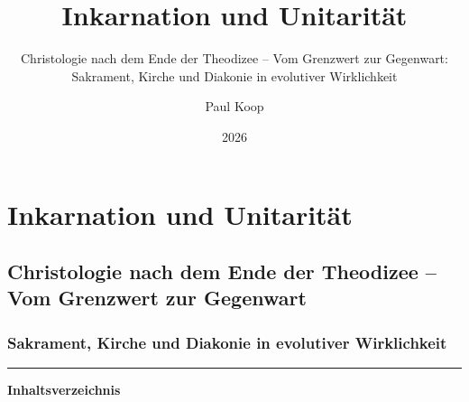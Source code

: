 \documentclass[
  ngerman,
]{article}
\title{Inkarnation und Unitarität}
\subtitle{Christologie nach dem Ende der Theodizee -- Vom Grenzwert zur
Gegenwart: Sakrament, Kirche und Diakonie in evolutiver Wirklichkeit}
\author{Paul Koop}
\date{2026}
\begin{document}
\maketitle

{
\setcounter{tocdepth}{3}
\tableofcontents
}
\section{Inkarnation und
Unitarität}\label{inkarnation-und-unitarituxe4t}

\subsection{Christologie nach dem Ende der Theodizee -- Vom Grenzwert
zur
Gegenwart}\label{christologie-nach-dem-ende-der-theodizee-vom-grenzwert-zur-gegenwart}

\subsubsection{Sakrament, Kirche und Diakonie in evolutiver
Wirklichkeit}\label{sakrament-kirche-und-diakonie-in-evolutiver-wirklichkeit}

\begin{center}\rule{0.5\linewidth}{0.5pt}\end{center}

\textbf{Inhaltsverzeichnis}
\end{document}
